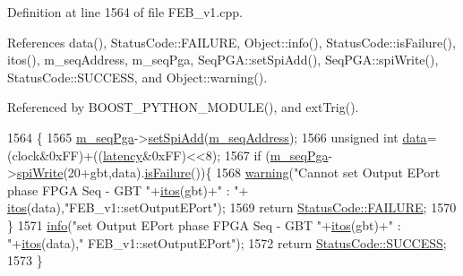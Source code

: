 Definition at line 1564 of file F\+E\+B\+\_\+v1.\+cpp.



References data(), Status\+Code\+::\+F\+A\+I\+L\+U\+RE, Object\+::info(), Status\+Code\+::is\+Failure(), itos(), m\+\_\+seq\+Address, m\+\_\+seq\+Pga, Seq\+P\+G\+A\+::set\+Spi\+Add(), Seq\+P\+G\+A\+::spi\+Write(), Status\+Code\+::\+S\+U\+C\+C\+E\+SS, and Object\+::warning().



Referenced by B\+O\+O\+S\+T\+\_\+\+P\+Y\+T\+H\+O\+N\+\_\+\+M\+O\+D\+U\+L\+E(), and ext\+Trig().


\begin{DoxyCode}
1564                                                                 \{
1565   \hyperlink{classFEB__v1_a6c7804ac86796f233a8393043adf2e77}{m\_seqPga}->\hyperlink{classSeqPGA_ac998ce3a6d9b5f2e88cc8393f8c1df53}{setSpiAdd}(\hyperlink{classFEB__v1_a1c1eb093fd1733b9510fcf8bc5c7ad08}{m\_seqAddress});
1566   \textcolor{keywordtype}{unsigned} \textcolor{keywordtype}{int} \hyperlink{classFEB__v1_a6bca4320bd3bbbc32efc81097f33421a}{data}=(clock&0xFF)+((\hyperlink{classFEB__v1_a68050d232efd8d6568910b09a2c18f62}{latency}&0xFF)<<8);
1567   \textcolor{keywordflow}{if} (\hyperlink{classFEB__v1_a6c7804ac86796f233a8393043adf2e77}{m\_seqPga}->\hyperlink{classSeqPGA_ad4421841ce4ce8b88ad13f63216f0743}{spiWrite}(20+gbt,data).\hyperlink{classStatusCode_a5dd22dc6eb2c52fc4cabc58f6dea2eb7}{isFailure}())\{
1568     \hyperlink{classObject_a65cd4fda577711660821fd2cd5a3b4c9}{warning}(\textcolor{stringliteral}{"Cannot set Output EPort phase FPGA Seq - GBT "}+\hyperlink{Tools_8h_af330027dbdafb9a30768b3613c553e60}{itos}(gbt)+\textcolor{stringliteral}{" : "}+
      \hyperlink{Tools_8h_af330027dbdafb9a30768b3613c553e60}{itos}(data),\textcolor{stringliteral}{"FEB\_v1::setOutputEPort"});
1569     \textcolor{keywordflow}{return} \hyperlink{classStatusCode_a6f565cbeadc76d14c72f047e5e85eb4ba3da73d4c469762eb9d3c960368252b26}{StatusCode::FAILURE};
1570   \}
1571   \hyperlink{classObject_a644fd329ea4cb85f54fa6846484b84a8}{info}(\textcolor{stringliteral}{"set Output EPort phase FPGA Seq - GBT "}+\hyperlink{Tools_8h_af330027dbdafb9a30768b3613c553e60}{itos}(gbt)+\textcolor{stringliteral}{" : "}+\hyperlink{Tools_8h_af330027dbdafb9a30768b3613c553e60}{itos}(data),\textcolor{stringliteral}{"
      FEB\_v1::setOutputEPort"});
1572   \textcolor{keywordflow}{return} \hyperlink{classStatusCode_a6f565cbeadc76d14c72f047e5e85eb4badd0da38d3ba0d922efd1f4619bc37ad8}{StatusCode::SUCCESS};
1573 \}
\end{DoxyCode}
\mbox{\label{classFEB__v1_ae8ed47630ca1408647e3eb5c1dfa0ec0}} 
